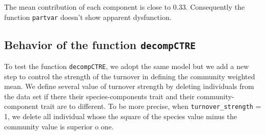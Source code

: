 \documentclass[12pt]{article}\usepackage[]{graphicx}\usepackage[]{color}
\begin{document}
The mean contribution of each component is close to 0.33. Consequently the function \texttt{partvar} doesn't show apparent dysfunction.

\subsection{Behavior of the function \texttt{decompCTRE}}

To test the function \texttt{decompCTRE}, we adopt the same model but we add a new step to control the strength of the turnover in defining the community weighted mean.
We define several value of turnover strength by deleting individuals from the data set if there their species-components trait and their community-component trait are to different. To be more precise, when \texttt{turnover\_strength} = 1, we delete all individual whose the square of the species value minus the community value is superior o one. 
\end{document}

